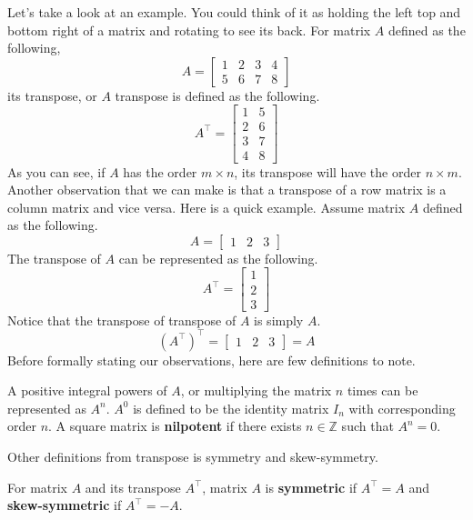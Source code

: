 \documentclass[../main.tex]{subfiles}
\begin{document}
Let's take a look at an example. You could think of it as holding
the left top and bottom right of a matrix and rotating to see its
back. For matrix $A$ defined as the following,
\[
A =
\begin{bmatrix}
    1 & 2 & 3 & 4 \\
    5 & 6 & 7 & 8
\end{bmatrix}
\]
its transpose, or $A$ transpose is defined as the following.
\[
A^\intercal =
\begin{bmatrix}
    1 & 5 \\
    2 & 6 \\
    3 & 7 \\
    4 & 8
\end{bmatrix}
\]
As you can see, if $A$ has the order $m \times n$, its transpose
will have the order $n \times m$. Another observation that we can
make is that a transpose of a row matrix is a column matrix and
vice versa. Here is a quick example. Assume matrix $A$ defined
as the following.
\[
A =
\begin{bmatrix}
    1 & 2 & 3
\end{bmatrix}
\]
The transpose of $A$ can be represented as the following.
\[
A^\intercal =
\begin{bmatrix}
    1 \\
    2 \\
    3
\end{bmatrix}
\]
Notice that the transpose of transpose of $A$ is simply $A$.
\[
(A^\intercal)^\intercal =
\begin{bmatrix}
    1 & 2 & 3
\end{bmatrix}
= A
\]
Before formally stating our observations, here are few definitions
to note.

\begin{definition}
A positive integral powers of $A$, or multiplying the matrix $n$
times can be represented as $A^n$. $A^0$ is defined to be the
identity matrix $I_n$ with corresponding order $n$. A square
matrix is \textbf{nilpotent} if there exists $n \in \mathbb{Z}$
such that $A^n = 0$.
\end{definition}

Other definitions from transpose is symmetry and skew-symmetry.

\begin{definition}
For matrix $A$ and its transpose $A^\intercal$, matrix $A$ is
\textbf{symmetric} if $A^\intercal = A$ and \textbf{skew-symmetric}
if $A^\intercal = -A$.
\end{definition}
\end{document}
